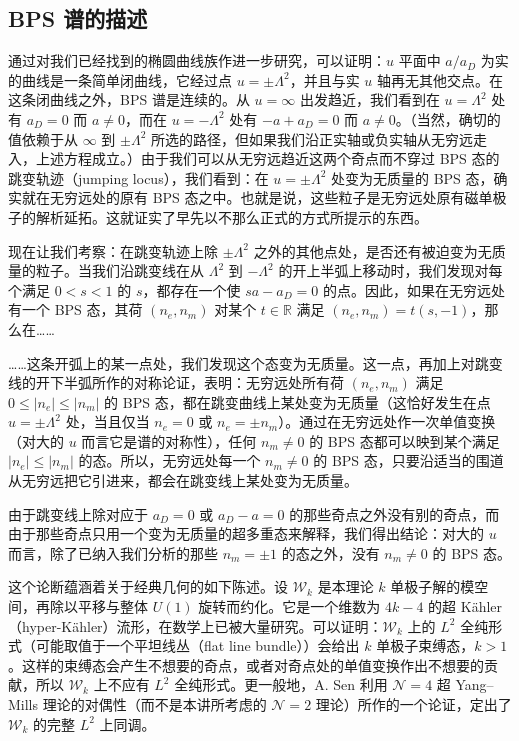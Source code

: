 \subsection{BPS 谱的描述}

通过对我们已经找到的椭圆曲线族作进一步研究，可以证明：$u$ 平面中 $a/a_D$ 为实的曲线是一条简单闭曲线，它经过点 $u=\pm\Lambda^2$，并且与实 $u$ 轴再无其他交点。在这条闭曲线之外，BPS 谱是连续的。从 $u=\infty$ 出发趋近，我们看到在 $u=\Lambda^2$ 处有 $a_D=0$ 而 $a\neq0$，而在 $u=-\Lambda^2$ 处有 $-a+a_D=0$ 而 $a\neq0$。（当然，确切的值依赖于从 $\infty$ 到 $\pm\Lambda^2$ 所选的路径，但如果我们沿正实轴或负实轴从无穷远走入，上述方程成立。）由于我们可以从无穷远趋近这两个奇点而不穿过 BPS 态的跳变轨迹（jumping locus），我们看到：在 $u=\pm\Lambda^2$ 处变为无质量的 BPS 态，确实就在无穷远处的原有 BPS 态之中。也就是说，这些粒子是无穷远处原有磁单极子的解析延拓。这就证实了早先以不那么正式的方式所提示的东西。

现在让我们考察：在跳变轨迹上除 $\pm\Lambda^2$ 之外的其他点处，是否还有被迫变为无质量的粒子。当我们沿跳变线在从 $\Lambda^2$ 到 $-\Lambda^2$ 的开上半弧上移动时，我们发现对每个满足 $0<s<1$ 的 $s$，都存在一个使 $sa-a_D=0$ 的点。因此，如果在无穷远处有一个 BPS 态，其荷 $(n_e,n_m)$ 对某个 $t\in\mathbb{R}$ 满足 $(n_e,n_m)=t(s,-1)$，那么在……

……这条开弧上的某一点处，我们发现这个态变为无质量。这一点，再加上对跳变线的开下半弧所作的对称论证，表明：无穷远处所有荷 $(n_e,n_m)$ 满足 $0\le|n_e|\le|n_m|$ 的 BPS 态，都在跳变曲线上某处变为无质量（这恰好发生在点 $u=\pm\Lambda^2$ 处，当且仅当 $n_e=0$ 或 $n_e=\pm n_m$）。通过在无穷远处作一次单值变换（对大的 $u$ 而言它是谱的对称性），任何 $n_m\neq0$ 的 BPS 态都可以映到某个满足 $|n_e|\le|n_m|$ 的态。所以，无穷远处每一个 $n_m\neq0$ 的 BPS 态，只要沿适当的围道从无穷远把它引进来，都会在跳变线上某处变为无质量。

由于跳变线上除对应于 $a_D=0$ 或 $a_D-a=0$ 的那些奇点之外没有别的奇点，而由于那些奇点只用一个变为无质量的超多重态来解释，我们得出结论：对大的 $u$ 而言，除了已纳入我们分析的那些 $n_m=\pm1$ 的态之外，没有 $n_m\neq0$ 的 BPS 态。

这个论断蕴涵着关于经典几何的如下陈述。设 $\mathcal{W}_k$ 是本理论 $k$ 单极子解的模空间，再除以平移与整体 $U(1)$ 旋转而约化。它是一个维数为 $4k-4$ 的超 Kähler（hyper-Kähler）流形，在数学上已被大量研究。可以证明：$\mathcal{W}_k$ 上的 $L^2$ 全纯形式（可能取值于一个平坦线丛（flat line bundle））会给出 $k$ 单极子束缚态，$k>1$。这样的束缚态会产生不想要的奇点，或者对奇点处的单值变换作出不想要的贡献，所以 $\mathcal{W}_k$ 上不应有 $L^2$ 全纯形式。更一般地，A. Sen 利用 $\mathcal{N}=4$ 超 Yang--Mills 理论的对偶性（而不是本讲所考虑的 $\mathcal{N}=2$ 理论）所作的一个论证，定出了 $\mathcal{W}_k$ 的完整 $L^2$ 上同调。

